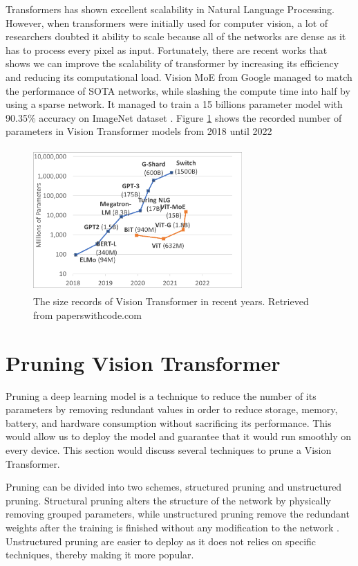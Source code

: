 \begin{enumerate}
    Transformers has shown excellent scalability in Natural Language Processing. However, when transformers were initially used for computer vision, a lot of researchers doubted it ability to scale because all of the networks are dense as it has to process every pixel as input. Fortunately, there are recent works that shows we can improve the scalability of transformer by increasing its efficiency and reducing its computational load. Vision MoE from Google managed to match the performance of SOTA networks, while slashing the compute time into half by using a sparse network. It managed to train a 15 billions parameter model with 90.35\% accuracy on ImageNet dataset \cite{scaling-sparse}. Figure \ref{fig:scaling} shows the recorded number of parameters in Vision Transformer models from 2018 until 2022

\begin{figure}[!h]
\includegraphics[width=8cm, height=5.5cm]{images/scaling.png}
\centering
\caption{The size records of Vision Transformer in recent years. Retrieved from paperswithcode.com}
\label{fig:scaling}
\end{figure}
\end{enumerate}

\section{Pruning Vision Transformer}

Pruning a deep learning model is a technique to reduce the number of its parameters by removing redundant values in order to reduce storage, memory, battery, and hardware consumption without sacrificing its performance. This would allow us to deploy the model and guarantee that it would run smoothly on every device. This section would discuss several techniques to prune a Vision Transformer.

Pruning can be divided into two schemes, structured pruning and unstructured pruning. Structural pruning alters the structure of the network by physically removing grouped parameters, while unstructured pruning remove the redundant weights after the training is finished without any modification to the network \cite{depgraph}. Unstructured pruning are easier to deploy as it does not relies on specific techniques, thereby making it more popular.

